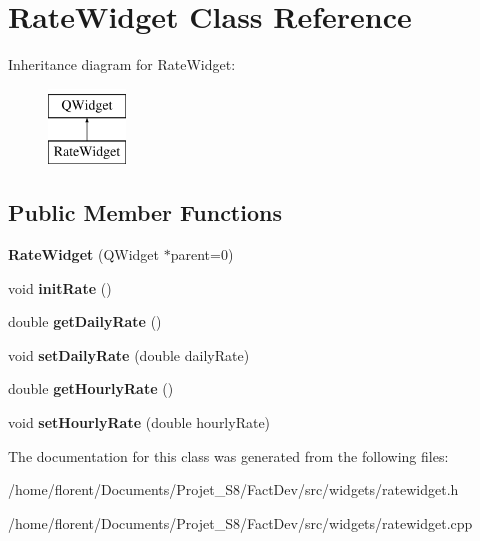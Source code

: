 \hypertarget{classRateWidget}{\section{Rate\-Widget Class Reference}
\label{classRateWidget}
}
Inheritance diagram for Rate\-Widget\-:\begin{figure}[H]
\begin{center}
\leavevmode
\includegraphics[height=2.000000cm]{dc/da5/classRateWidget}
\end{center}
\end{figure}
\subsection*{Public Member Functions}
\begin{DoxyCompactItemize}
\item 
\hypertarget{classRateWidget_ad1cb6a97e47b408043e83708ff8af15e}{{\bfseries Rate\-Widget} (Q\-Widget $\ast$parent=0)}\label{classRateWidget_ad1cb6a97e47b408043e83708ff8af15e}

\item 
\hypertarget{classRateWidget_a4a3ec9a546055d6ecb3bd1a9ee8082a6}{void {\bfseries init\-Rate} ()}\label{classRateWidget_a4a3ec9a546055d6ecb3bd1a9ee8082a6}

\item 
\hypertarget{classRateWidget_a0a72cea5ff524b47e513dcb21aea2022}{double {\bfseries get\-Daily\-Rate} ()}\label{classRateWidget_a0a72cea5ff524b47e513dcb21aea2022}

\item 
\hypertarget{classRateWidget_a8a3bccabb5c33e9f617ed85a68398b5a}{void {\bfseries set\-Daily\-Rate} (double daily\-Rate)}\label{classRateWidget_a8a3bccabb5c33e9f617ed85a68398b5a}

\item 
\hypertarget{classRateWidget_a50285d4472979e004c706ff5640e8227}{double {\bfseries get\-Hourly\-Rate} ()}\label{classRateWidget_a50285d4472979e004c706ff5640e8227}

\item 
\hypertarget{classRateWidget_a8135738c8a54389110de6751d9e2728e}{void {\bfseries set\-Hourly\-Rate} (double hourly\-Rate)}\label{classRateWidget_a8135738c8a54389110de6751d9e2728e}

\end{DoxyCompactItemize}


The documentation for this class was generated from the following files\-:\begin{DoxyCompactItemize}
\item 
/home/florent/\-Documents/\-Projet\-\_\-\-S8/\-Fact\-Dev/src/widgets/ratewidget.\-h\item 
/home/florent/\-Documents/\-Projet\-\_\-\-S8/\-Fact\-Dev/src/widgets/ratewidget.\-cpp\end{DoxyCompactItemize}
